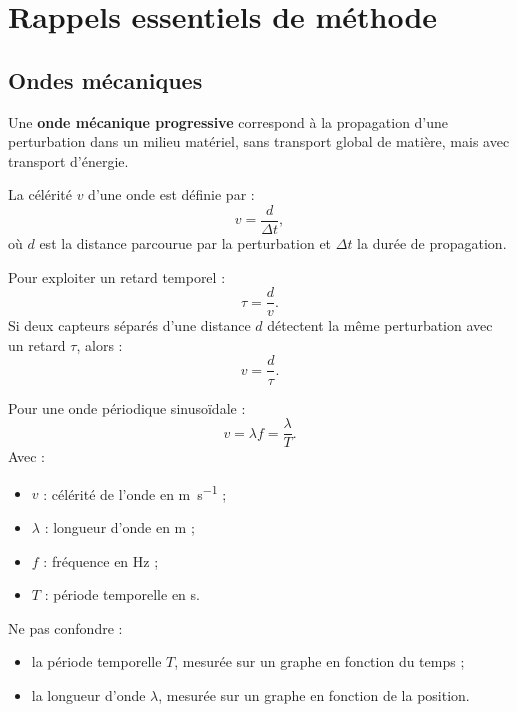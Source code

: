 \documentclass[11pt,a4paper]{article}
\begin{document}
\tableofcontents
\newpage

\section{Rappels essentiels de méthode}

\subsection{Ondes mécaniques}

\begin{retenirbox}
Une \textbf{onde mécanique progressive} correspond à la propagation d'une perturbation dans un milieu matériel, sans transport global de matière, mais avec transport d'énergie.

La célérité $v$ d'une onde est définie par :
\[
v=\frac{d}{\Delta t},
\]
où $d$ est la distance parcourue par la perturbation et $\Delta t$ la durée de propagation.
\end{retenirbox}

\begin{methodbox}
Pour exploiter un retard temporel :
\[
\tau = \frac{d}{v}.
\]
Si deux capteurs séparés d'une distance $d$ détectent la même perturbation avec un retard $\tau$, alors :
\[
v=\frac{d}{\tau}.
\]
\end{methodbox}

\begin{retenirbox}
Pour une onde périodique sinusoïdale :
\[
v=\lambda f=\frac{\lambda}{T}.
\]
Avec :
\begin{itemize}
  \item $v$ : célérité de l'onde en \si{m.s^{-1}} ;
  \item $\lambda$ : longueur d'onde en \si{m} ;
  \item $f$ : fréquence en \si{Hz} ;
  \item $T$ : période temporelle en \si{s}.
\end{itemize}
\end{retenirbox}

\begin{erreurbox}
Ne pas confondre :
\begin{itemize}
  \item la période temporelle $T$, mesurée sur un graphe en fonction du temps ;
  \item la longueur d'onde $\lambda$, mesurée sur un graphe en fonction de la position.
\end{itemize}
\end{erreurbox}
\end{document}
